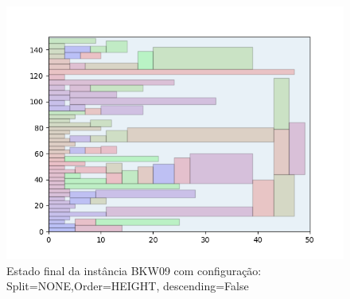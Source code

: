 \begin{figure}[H]
    \centering
    \caption[]{Estado final da instância BKW09 com configuração: Split=NONE,Order=HEIGHT, descending=False}
    \label{fig:bkw09-none-height-false}
    \includegraphics[scale=0.5]{output/figures/bkw/bkw09/none/height/false/000}
\end{figure}